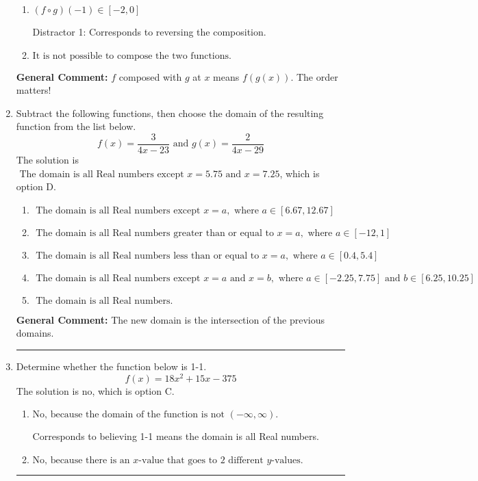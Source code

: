 \documentclass{extbook}[14pt]
\newcommand{\litem}[1]{\item #1

\rule{\textwidth}{0.4pt}}
\begin{document}
\begin{enumerate}
{\begin{enumerate}[label=\Alph*.]
 Distractor 2: Corresponds to being slightly off from the solution.
\item \( (f \circ g)(-1) \in [-2, 0] \)

 Distractor 1: Corresponds to reversing the composition.
\item \( \text{It is not possible to compose the two functions.} \)


\end{enumerate}

\textbf{General Comment:} $f$ composed with $g$ at $x$ means $f(g(x))$. The order matters!
}
\litem{
Subtract the following functions, then choose the domain of the resulting function from the list below.
\[ f(x) = \frac{3}{4x-23} \text{ and } g(x) = \frac{2}{4x-29} \]The solution is \( \text{ The domain is all Real numbers except } x = 5.75 \text{ and } x = 7.25 \), which is option D.\begin{enumerate}[label=\Alph*.]
\item \( \text{ The domain is all Real numbers except } x = a, \text{ where } a \in [6.67, 12.67] \)


\item \( \text{ The domain is all Real numbers greater than or equal to } x = a, \text{ where } a \in [-12, 1] \)


\item \( \text{ The domain is all Real numbers less than or equal to } x = a, \text{ where } a \in [0.4, 5.4] \)


\item \( \text{ The domain is all Real numbers except } x = a \text{ and } x = b, \text{ where } a \in [-2.25, 7.75] \text{ and } b \in [6.25, 10.25] \)


\item \( \text{ The domain is all Real numbers. } \)


\end{enumerate}

\textbf{General Comment:} The new domain is the intersection of the previous domains.
}
\litem{
Determine whether the function below is 1-1.
\[ f(x) = 18 x^2 + 15 x - 375 \]The solution is \( \text{no} \), which is option C.\begin{enumerate}[label=\Alph*.]
\item \( \text{No, because the domain of the function is not $(-\infty, \infty)$.} \)

Corresponds to believing 1-1 means the domain is all Real numbers.
\item \( \text{No, because there is an $x$-value that goes to 2 different $y$-values.} \)


\end{enumerate}}
\end{enumerate}
\end{document}
